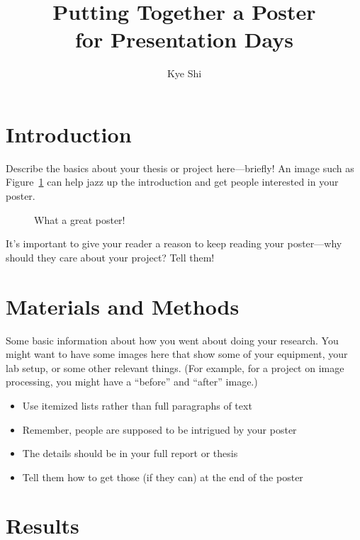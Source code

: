 \documentclass[thesis]{hmcposter}
\author{Kye Shi}
\title{Putting Together a Poster\\for Presentation Days}
\begin{document}
\begin{poster}

\section{Introduction}

Describe the basics about your thesis or project here---briefly!  An
image such as Figure~\ref{fig:our-poster} can help jazz up the
introduction and get people interested in your poster.

\begin{figure}
\begin{center}
\caption{What a great poster!}%
\label{fig:our-poster}
\end{center}
\end{figure}

It's important to give your reader a reason to keep reading your
poster---why should they care about your project?  Tell them!


\section{Materials and Methods}%

Some basic information about how you went about doing your
research.  You might want to have some images here that show some of
your equipment, your lab setup, or some other relevant things.  (For
example, for a project on image processing, you might have a
``before'' and ``after'' image.)

\begin{itemize}
\item Use itemized lists rather than full paragraphs of text
\item Remember, people are supposed to be intrigued by your poster
\item The details should be in your full report or thesis
\item Tell them how to get those (if they can) at the end of the poster
\end{itemize}


\section{Results}%


\end{poster}
\end{document}
